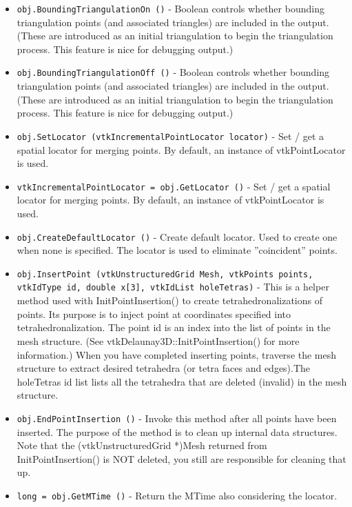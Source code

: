 \begin{itemize}
\item  \verb|obj.BoundingTriangulationOn ()| -  Boolean controls whether bounding triangulation points (and associated
 triangles) are included in the output. (These are introduced as an
 initial triangulation to begin the triangulation process. This feature
 is nice for debugging output.)

\item  \verb|obj.BoundingTriangulationOff ()| -  Boolean controls whether bounding triangulation points (and associated
 triangles) are included in the output. (These are introduced as an
 initial triangulation to begin the triangulation process. This feature
 is nice for debugging output.)

\item  \verb|obj.SetLocator (vtkIncrementalPointLocator locator)| -  Set / get a spatial locator for merging points. By default, 
 an instance of vtkPointLocator is used.

\item  \verb|vtkIncrementalPointLocator = obj.GetLocator ()| -  Set / get a spatial locator for merging points. By default, 
 an instance of vtkPointLocator is used.

\item  \verb|obj.CreateDefaultLocator ()| -  Create default locator. Used to create one when none is specified. The 
 locator is used to eliminate ''coincident'' points.

\item  \verb|obj.InsertPoint (vtkUnstructuredGrid Mesh, vtkPoints points, vtkIdType id, double x[3], vtkIdList holeTetras)| -  This is a helper method used with InitPointInsertion() to create
 tetrahedronalizations of points. Its purpose is to inject point at
 coordinates specified into tetrahedronalization. The point id is an index
 into the list of points in the mesh structure.  (See
 vtkDelaunay3D::InitPointInsertion() for more information.)  When you have
 completed inserting points, traverse the mesh structure to extract desired
 tetrahedra (or tetra faces and edges).The holeTetras id list lists all the
 tetrahedra that are deleted (invalid) in the mesh structure.

\item  \verb|obj.EndPointInsertion ()| -  Invoke this method after all points have been inserted. The purpose of
 the method is to clean up internal data structures. Note that the 
 (vtkUnstructuredGrid *)Mesh returned from InitPointInsertion() is NOT
 deleted, you still are responsible for cleaning that up.

\item  \verb|long = obj.GetMTime ()| -  Return the MTime also considering the locator.

\end{itemize}
